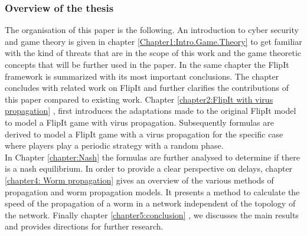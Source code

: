 %

\subsubsection{Overview of the thesis}

The organisation of this paper is the following.  An introduction to cyber security and game theory is given in chapter \ref{Chapter1:Intro.Game.Theory} to get familiar with the kind of threats that are in the scope of this work and the game theoretic concepts that will be further used in the paper. In the same chapter the FlipIt framework is summarized with its most important conclusions. The chapter concludes with related work on FlipIt and further clarifies the contributions of this paper compared to existing work. 
Chapter \ref{chapter2:FlipIt with virus propagation} , first introduces the adaptations made to the original FlipIt model to model a FlipIt game with virus propagation. Subsequently formulas are derived to model a FlipIt game with a virus propagation for the specific case where players play a periodic strategy with a random phase. \\
In Chapter \ref{chapter:Nash} the formulas are further analysed to determine if there is a nash equilibrium. 
In order to provide a clear perspective on delays, chapter \ref{chapter4: Worm propagation} gives an overview of the various methods of propagation and worm propagation models. It presents a method to calculate the speed of the propagation of a worm in a network independent of the topology of the network.
Finally chapter \ref{chapter5:conclusion} , we discusses the main results and provides directions for further research.


